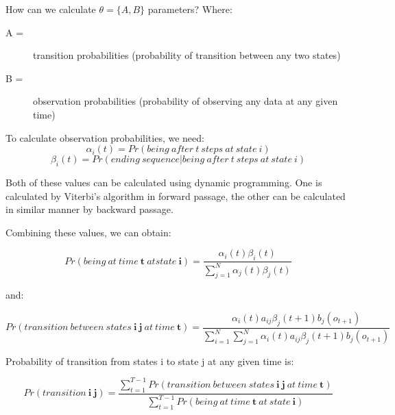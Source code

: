 \documentclass[12pt,a4paper,english]{article}
\begin{document}
How can we calculate $\theta = \{A, B\}$ parameters? \newline
Where:
\begin{description}
    \item[A =] transition probabilities (probability of transition between any two states)
	\item[B =] observation probabilities (probability of observing any data at any given time)
\end{description}

To calculate observation probabilities, we need:
\begin{equation}
    \alpha_i(t) = Pr(being \: after \: t \: steps \: at \: state \: i)
\end{equation}
\begin{equation}
    \beta_i(t) = Pr(ending \: sequence | being \: after \: t \: steps \: at \: state \: i)
\end{equation}

Both of these values can be calculated using dynamic programming. One is calculated by Viterbi's algorithm in forward passage, the other can be calculated in similar manner by backward passage.

\newpage

Combining these values, we can obtain:

\begin{equation}
    Pr(being \: at \: time \: \boldsymbol{t} \: at state \: \boldsymbol{i}) = \frac {\alpha_i(t)\beta_i(t)} {\sum_{j=1}^{N} \alpha_j(t)\beta_j(t) }
\end{equation}
	
and:
	
\begin{equation}
    Pr(transition \: between \: states \: \boldsymbol{i} \: \boldsymbol{j} \: at \: time \: \boldsymbol{t}) = \frac {\alpha_i(t)a_{ij}\beta_j(t + 1)b_j(o_{t+1})} {\sum_{i=1}^{N} \sum_{j=1}^{N} \alpha_i(t)a_{ij}\beta_j(t + 1)b_j(o_{t+1})}
\end{equation}

Probability of transition from states i to state j at any given time is:
	
\begin{equation}
    Pr(transition \: \boldsymbol{i} \: \boldsymbol{j}) = \frac {\sum_{t=1}^{T-1} Pr(transition \: between \: states \: \boldsymbol{i} \: \boldsymbol{j} \: at \: time \: \boldsymbol{t})} {\sum_{t=1}^{T-1} Pr(being \: at \: time \: \boldsymbol{t} \: at \: state \: \boldsymbol{i}) }
\end{equation}
	
\end{document}
